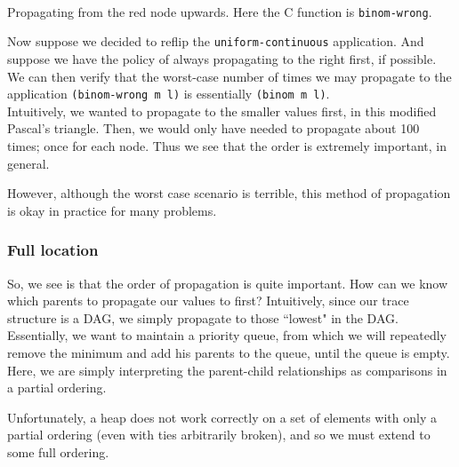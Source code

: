 \documentclass[10pt]{article}
\begin{document}
\begin{center}
 \\
\begin{small} {Propagating from the red node upwards.  Here the C function is {\tt binom-wrong}.} \end{small}
\end{center}

Now suppose we decided to reflip the {\tt uniform-continuous} application.  And suppose we have the policy of always propagating to the right first, if possible.  We can then verify that the worst-case number of times we may propagate to the application {\tt (binom-wrong m l)} is essentially {\tt (binom m l)}.  \\

Intuitively, we wanted to propagate to the smaller values first, in this modified Pascal's triangle.  Then, we would only have needed to propagate about 100 times; once for each node.  Thus we see that the order is extremely important, in general.  

However, although the worst case scenario is terrible, this method of propagation is okay in practice for many problems.

\subsubsection{Full location}

So, we see is that the order of propagation is quite important.  How can we know which parents to propagate our values to first?   Intuitively, since our trace structure is a DAG, we simply propagate to those ``lowest" in the DAG.  Essentially, we want to maintain a priority queue, from which we will repeatedly remove the minimum and add his parents to the queue, until the queue is empty.  Here, we are simply interpreting the parent-child relationships as comparisons in a partial ordering.  


Unfortunately, a heap does not work correctly on a set of elements with only a partial ordering (even with ties arbitrarily broken), and so we must extend to some full ordering.  
\end{document}
